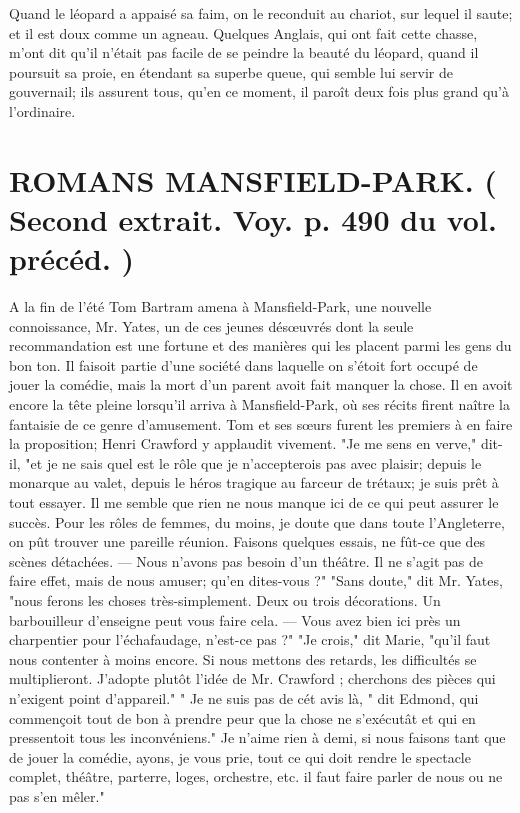 \setcounter{page}{101} Quand le léopard a appaisé sa faim, on le reconduit au chariot, sur lequel il saute; et il est doux comme un agneau.
Quelques Anglais, qui ont fait cette chasse, m'ont dit qu'il n'était pas facile de se peindre la beauté du léopard, quand il poursuit sa proie, en étendant sa superbe queue, qui semble lui servir de gouvernail; ils assurent tous, qu'en ce moment, il paroît deux fois plus grand qu'à l'ordinaire.
\section{ROMANS \large{MANSFIELD-PARK.} \small{( Second extrait. Voy. p. 490 du vol. précéd. )}}
A la fin de l'été Tom Bartram amena à Mansfield-Park, une nouvelle connoissance, Mr. Yates, un de ces jeunes désœuvrés dont la seule recommandation est une fortune et des manières qui les placent parmi les gens du bon ton. Il faisoit partie d'une société dans laquelle on s'étoit fort occupé de jouer la comédie, mais la mort d'un parent avoit fait manquer la chose. Il en avoit encore la\setcounter{page}{102} tête pleine lorsqu'il arriva à Mansfield-Park, où ses récits firent naître la fantaisie de ce genre d'amusement. Tom et ses sœurs furent les premiers à en faire la proposition; Henri Crawford y applaudit vivement.
"Je me sens en verve," dit-il, "et je ne sais quel est le rôle que je n'accepterois pas avec plaisir; depuis le monarque au valet, depuis le héros tragique au farceur de trétaux; je suis prêt à tout essayer. Il me semble que rien ne nous manque ici de ce qui peut assurer le succès. Pour les rôles de femmes, du moins, je doute que dans toute l'Angleterre, on pût trouver une pareille réunion. Faisons quelques essais, ne fût-ce que des scènes détachées. — Nous n'avons pas besoin d'un théâtre. Il ne s'agit pas de faire effet, mais de nous amuser; qu'en dites-vous ?"
"Sans doute," dit Mr. Yates, "nous ferons les choses très-simplement. Deux ou trois décorations. Un barbouilleur d'enseigne peut vous faire cela. — Vous avez bien ici près un charpentier pour l'échafaudage, n'est-ce pas ?"
"Je crois," dit Marie, "qu'il faut nous contenter à moins encore. Si nous mettons des retards, les difficultés se multiplieront. J'adopte plutôt l'idée de Mr. Crawford ;\setcounter{page}{103} cherchons des pièces qui n'exigent point d'appareil."
" Je ne suis pas de cét avis là, " dit Edmond, qui commençoit tout de bon à prendre peur que la chose ne s'exécutât et qui en pressentoit tous les inconvéniens." Je n'aime rien à demi, si nous faisons tant que de jouer la comédie, ayons, je vous prie, tout ce qui doit rendre le spectacle complet, théâtre, parterre, loges, orchestre, etc. il faut faire parler de nous ou ne pas s'en mêler."
